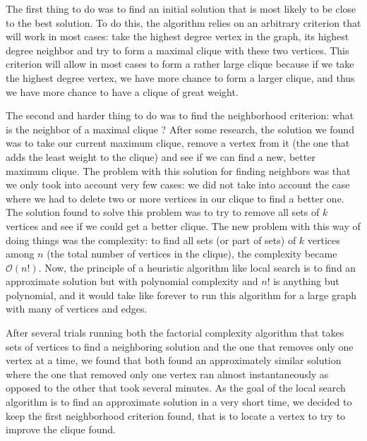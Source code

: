 The first thing to do was to find an initial solution that is most likely to be 
close to the best solution. To do this, the algorithm relies on an arbitrary 
criterion that will work in most cases: take the highest degree vertex in the 
graph, its highest degree neighbor and try to form a maximal clique with these 
two vertices. 
\newpage
This criterion will allow in most cases to form a rather large 
clique because if we take the highest degree vertex, we have more chance to form 
a larger clique, and thus we have more chance to have a clique of great weight.
\bigskip

The second and harder thing to do was to find the neighborhood criterion: what 
is the neighbor of a maximal clique ? After some research, the solution we found 
was to take our current maximum clique, remove a vertex from it (the one that adds 
the least weight to the clique) and see if we can find a new, better maximum 
clique. The problem with this solution for finding neighbors was that we only 
took into account very few cases: we did not take into account the case where we 
had to delete two or more vertices in our clique to find a better one. The 
solution found to solve this problem was to try to remove all sets of $k$ vertices 
and see if we could get a better clique. The new problem with this way of doing 
things was the complexity: to find all sets (or part of sets) of $k$ vertices among 
$n$ (the total number of vertices in the clique), the complexity became $\mathcal{O}(n!)$. 
Now, the principle of a heuristic algorithm like local search is to find an approximate 
solution but with polynomial complexity and $n!$ is anything but polynomial, and it 
would take like forever to run this algorithm for a large graph with many of vertices 
and edges.
\bigskip

After several trials running both the factorial complexity algorithm that takes 
sets of vertices to find a neighboring solution and the one that removes only one 
vertex at a time, we found that both found an approximately similar solution where 
the one that removed only one vertex ran almost instantaneously as opposed to the 
other that took several minutes. As the goal of the local search algorithm is to 
find an approximate solution in a very short time, we decided to keep the first 
neighborhood criterion found, that is to locate a vertex to try to improve the 
clique found.